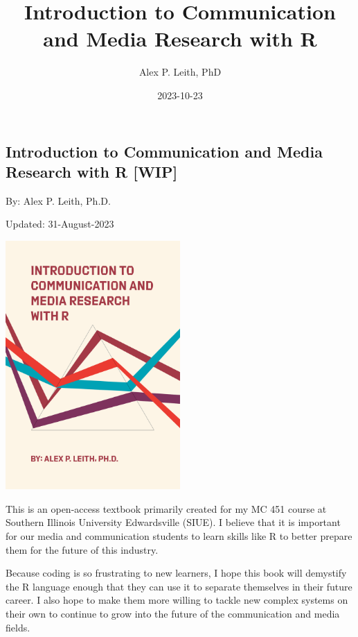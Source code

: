 \documentclass[
  b5paper]{book}
\title{Introduction to Communication and Media Research with R}
\author{Alex P. Leith, PhD}
\date{2023-10-23}
\begin{document}
\maketitle

{
\setcounter{tocdepth}{1}
\tableofcontents
}
\hypertarget{section}{%
\chapter*{}\label{section}}

\hypertarget{introduction-to-communication-and-media-research-with-r-wip}{%
\section*{Introduction to Communication and Media Research with R {[}WIP{]}}\label{introduction-to-communication-and-media-research-with-r-wip}}

By: Alex P. Leith, Ph.D.

Updated: 31-August-2023

\href{Current\%20Book\%20Cover\%20(Art\%20created\%20with\%20R\textquotesingle{}s\%20aRtsy\%20package)}{\includegraphics[width=0.5\textwidth,height=\textheight]{cover_2.png}}

This is an open-access textbook primarily created for my MC 451 course at Southern Illinois University Edwardsville (SIUE). I believe that it is important for our media and communication students to learn skills like R to better prepare them for the future of this industry.

Because coding is so frustrating to new learners, I hope this book will demystify the R language enough that they can use it to separate themselves in their future career. I also hope to make them more willing to tackle new complex systems on their own to continue to grow into the future of the communication and media fields.
\end{document}

